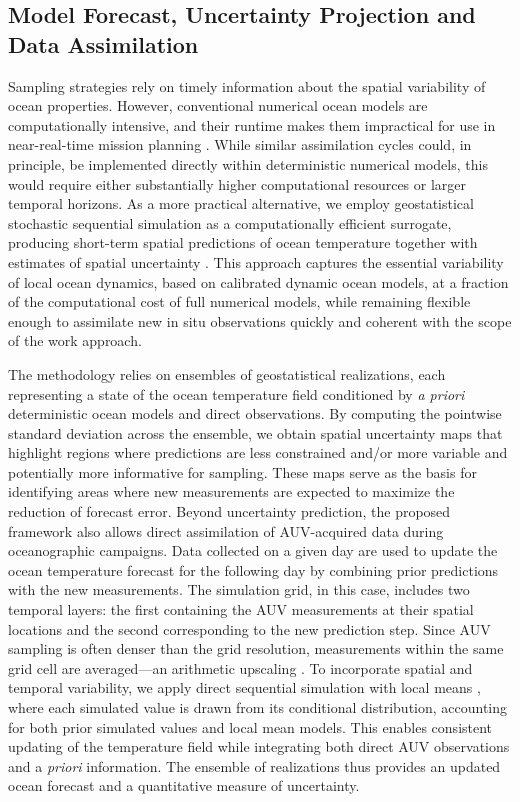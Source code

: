 \subsection{Model Forecast, Uncertainty Projection and Data Assimilation}

Sampling strategies rely on timely information about the spatial
variability of ocean properties. However, conventional numerical ocean
models are computationally intensive, and their runtime makes them
impractical for use in near-real-time mission planning . While similar assimilation cycles could, in
principle, be implemented directly within deterministic numerical
models, this would require either substantially higher computational
resources or larger temporal horizons. As a more practical
alternative, we employ geostatistical stochastic sequential simulation
as a computationally efficient surrogate, producing short-term spatial
predictions of ocean temperature together with estimates of spatial
uncertainty \cite{deutsch1992}. This approach captures the essential
variability of local ocean dynamics, based on calibrated dynamic ocean
models, at a fraction of the computational cost of full numerical
models, while remaining flexible enough to assimilate new in situ
observations quickly \cite{Duarte2025} and coherent with the scope of
the work approach. 

The methodology relies on ensembles of geostatistical realizations,
each representing a state of the ocean temperature field conditioned
by \emph{a priori} deterministic ocean models \cite{CMEMS2017} and
direct observations. By computing the pointwise standard deviation
across the ensemble, we obtain spatial uncertainty maps that highlight
regions where predictions are less constrained and/or more variable
and potentially more informative for sampling. These maps serve as the
basis for identifying areas where new measurements are expected to
maximize the reduction of forecast error. 
Beyond uncertainty prediction, the proposed framework also allows direct assimilation of AUV-acquired data during oceanographic campaigns. Data collected on a given day are used to update the ocean temperature forecast for the following day by combining prior predictions with the new measurements. The simulation grid, in this case, includes two temporal layers: the first containing the AUV measurements at their spatial locations and the second corresponding to the new prediction step. Since AUV sampling is often denser than the grid resolution, measurements within the same grid cell are averaged—an arithmetic upscaling \cite{Duarte2025}. To incorporate spatial and temporal variability, we apply direct sequential simulation with local means \cite{soares2001direct}, where each simulated value is drawn from its conditional distribution, accounting for both prior simulated values and local mean models. This enables consistent updating of the temperature field while integrating both direct AUV observations and a \textit{priori} information. The ensemble of realizations thus provides an updated ocean forecast and a quantitative measure of uncertainty.
 
